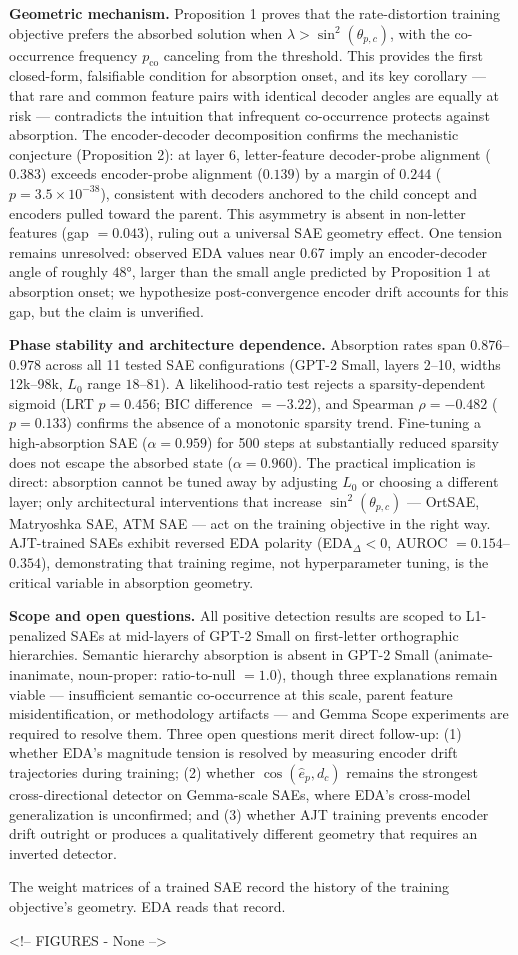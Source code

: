 \documentclass{article}
\begin{document}
\textbf{Geometric mechanism.} Proposition 1 proves that the rate-distortion training objective prefers
the absorbed solution when $\lambda > \sin^2(\theta_{p,c})$, with the co-occurrence frequency
$p_\text{co}$ canceling from the threshold. This provides the first closed-form, falsifiable
condition for absorption onset, and its key corollary — that rare and common feature pairs with
identical decoder angles are equally at risk — contradicts the intuition that infrequent co-occurrence
protects against absorption. The encoder-decoder decomposition confirms the mechanistic conjecture
(Proposition 2): at layer 6, letter-feature decoder-probe alignment ($0.383$) exceeds
encoder-probe alignment ($0.139$) by a margin of $0.244$ ($p = 3.5 \times 10^{-38}$), consistent
with decoders anchored to the child concept and encoders pulled toward the parent. This asymmetry
is absent in non-letter features (gap $= 0.043$), ruling out a universal SAE geometry effect.
One tension remains unresolved: observed EDA values near $0.67$ imply an encoder-decoder angle
of roughly $48°$, larger than the small angle predicted by Proposition 1 at absorption onset;
we hypothesize post-convergence encoder drift accounts for this gap, but the claim is unverified.

\textbf{Phase stability and architecture dependence.} Absorption rates span $0.876$–$0.978$
across all 11 tested SAE configurations (GPT-2 Small, layers 2–10, widths 12k–98k, $L_0$
range $18$–$81$). A likelihood-ratio test rejects a sparsity-dependent sigmoid (LRT $p = 0.456$;
BIC difference $= -3.22$), and Spearman $\rho = -0.482$ ($p = 0.133$) confirms the absence of
a monotonic sparsity trend. Fine-tuning a high-absorption SAE ($\alpha = 0.959$) for 500 steps
at substantially reduced sparsity does not escape the absorbed state ($\alpha = 0.960$). The
practical implication is direct: absorption cannot be tuned away by adjusting $L_0$ or
choosing a different layer; only architectural interventions that increase $\sin^2(\theta_{p,c})$
— OrtSAE, Matryoshka SAE, ATM SAE — act on the training objective in the right way. AJT-trained
SAEs exhibit reversed EDA polarity (EDA$_\Delta < 0$, AUROC $= 0.154$–$0.354$), demonstrating
that training regime, not hyperparameter tuning, is the critical variable in absorption geometry.

\textbf{Scope and open questions.} All positive detection results are scoped to L1-penalized SAEs at
mid-layers of GPT-2 Small on first-letter orthographic hierarchies. Semantic hierarchy absorption
is absent in GPT-2 Small (animate-inanimate, noun-proper: ratio-to-null $= 1.0$), though three
explanations remain viable — insufficient semantic co-occurrence at this scale, parent feature
misidentification, or methodology artifacts — and Gemma Scope experiments are required to resolve
them. Three open questions merit direct follow-up: (1) whether EDA's magnitude tension is resolved
by measuring encoder drift trajectories during training; (2) whether $\cos(\hat{e}_p, d_c)$
remains the strongest cross-directional detector on Gemma-scale SAEs, where EDA's cross-model
generalization is unconfirmed; and (3) whether AJT training prevents encoder drift outright or
produces a qualitatively different geometry that requires an inverted detector.

The weight matrices of a trained SAE record the history of the training objective's geometry.
EDA reads that record.

<!-- FIGURES
- None
-->






\end{document}
